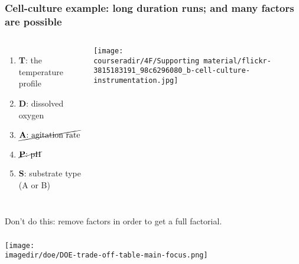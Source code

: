 \documentclass[11pt,aspectratio=169,mathserif]{beamer}
\begin{document}
\begin{frame}\frametitle{Cell-culture example: long duration runs; and many factors are possible}
	\begin{columns}[c]
			\begin{enumerate}
				\item	\textbf{T}: the temperature profile
				\item	\textbf{D}: dissolved oxygen
				\item	$\cancel{\text{\textbf{A}: agitation rate}}$
				\item	$\cancel{\text{\textbf{P}: pH}}$
				\item	\textbf{S}: substrate type (A or B)
			\end{enumerate}
		
			
			\vspace{0.2cm}
			
			\centerline{\texttt{[image: \\courseradir/4F/Supporting material/flickr-3815183191\_98c6296080\_b-cell-culture-instrumentation.jpg]}}
	\end{columns}

	\vfill
	{\color{red} Don't do this:} remove factors in order to get a full factorial.
	
\end{frame}

\begin{frame}\frametitle{}
	\centerline{\texttt{[image: \\imagedir/doe/DOE-trade-off-table-main-focus.png]}}
\end{frame}
\end{document}
